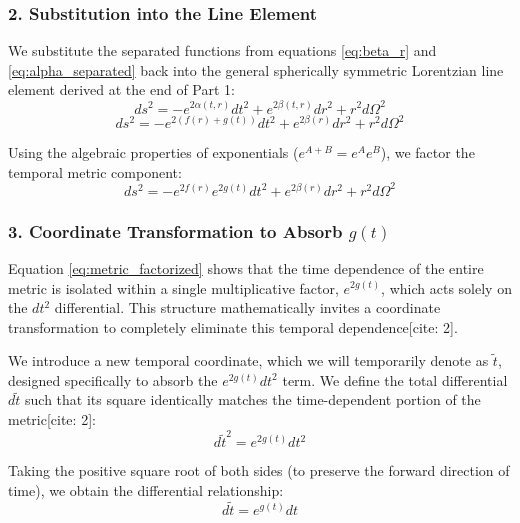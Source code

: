 \documentclass[11pt, a4paper]{report}
\begin{document}
\subsubsection*{2. Substitution into the Line Element}

We substitute the separated functions from equations \eqref{eq:beta_r} and \eqref{eq:alpha_separated} back into the general spherically symmetric Lorentzian line element derived at the end of Part 1:
\begin{equation}
    ds^2 = -e^{2\alpha(t,r)} dt^2 + e^{2\beta(t,r)} dr^2 + r^2 d\Omega^2
\end{equation}
\begin{equation}
    ds^2 = -e^{2(f(r) + g(t))} dt^2 + e^{2\beta(r)} dr^2 + r^2 d\Omega^2
\end{equation}

Using the algebraic properties of exponentials ($e^{A+B} = e^A e^B$), we factor the temporal metric component:
\begin{equation}
    ds^2 = -e^{2f(r)} e^{2g(t)} dt^2 + e^{2\beta(r)} dr^2 + r^2 d\Omega^2 \label{eq:metric_factorized}
\end{equation}

\subsubsection*{3. Coordinate Transformation to Absorb $g(t)$}

Equation \eqref{eq:metric_factorized} shows that the time dependence of the entire metric is isolated within a single multiplicative factor, $e^{2g(t)}$, which acts solely on the $dt^2$ differential. This structure mathematically invites a coordinate transformation to completely eliminate this temporal dependence[cite: 2]. 

We introduce a new temporal coordinate, which we will temporarily denote as $\tilde{t}$, designed specifically to absorb the $e^{2g(t)} dt^2$ term. We define the total differential $d\tilde{t}$ such that its square identically matches the time-dependent portion of the metric[cite: 2]:
\begin{equation}
    d\tilde{t}^2 = e^{2g(t)} dt^2 \label{eq:dttilde_squared}
\end{equation}

Taking the positive square root of both sides (to preserve the forward direction of time), we obtain the differential relationship:
\begin{equation}
    d\tilde{t} = e^{g(t)} dt
\end{equation}
\end{document}

